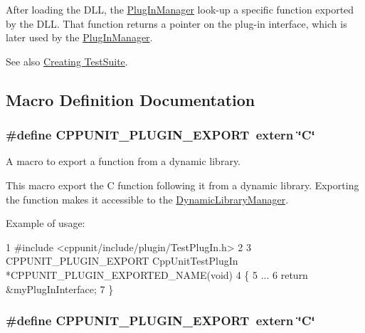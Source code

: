 After loading the D\+L\+L, the \hyperlink{class_plug_in_manager}{Plug\+In\+Manager} look-\/up a specific function exported by the D\+L\+L. That function returns a pointer on the plug-\/in interface, which is later used by the \hyperlink{class_plug_in_manager}{Plug\+In\+Manager}.

\begin{DoxySeeAlso}{See also}
\hyperlink{group___creating_test_suite}{Creating Test\+Suite}. 
\end{DoxySeeAlso}


\subsection{Macro Definition Documentation}
\hypertarget{group___writing_test_plug_in_ga477408f06c41af1d46b8f17f21b3b5d6}{
\subsubsection[{C\+P\+P\+U\+N\+I\+T\+\_\+\+P\+L\+U\+G\+I\+N\+\_\+\+E\+X\+P\+O\+R\+T}]{\setlength{\rightskip}{0pt plus 5cm}\#define C\+P\+P\+U\+N\+I\+T\+\_\+\+P\+L\+U\+G\+I\+N\+\_\+\+E\+X\+P\+O\+R\+T~extern \char`\"{}C\char`\"{}}}\label{group___writing_test_plug_in_ga477408f06c41af1d46b8f17f21b3b5d6}


A macro to export a function from a dynamic library. 

This macro export the C function following it from a dynamic library. Exporting the function makes it accessible to the \hyperlink{class_dynamic_library_manager}{Dynamic\+Library\+Manager}.

Example of usage\+: 
\begin{DoxyCode}
1 #include <cppunit/include/plugin/TestPlugIn.h>
2 
3 CPPUNIT\_PLUGIN\_EXPORT CppUnitTestPlugIn *CPPUNIT\_PLUGIN\_EXPORTED\_NAME(void)
4 \{
5   ...
6   return &myPlugInInterface;
7 \}
\end{DoxyCode}
 \hypertarget{group___writing_test_plug_in_ga477408f06c41af1d46b8f17f21b3b5d6}{
\subsubsection[{C\+P\+P\+U\+N\+I\+T\+\_\+\+P\+L\+U\+G\+I\+N\+\_\+\+E\+X\+P\+O\+R\+T}]{\setlength{\rightskip}{0pt plus 5cm}\#define C\+P\+P\+U\+N\+I\+T\+\_\+\+P\+L\+U\+G\+I\+N\+\_\+\+E\+X\+P\+O\+R\+T~extern \char`\"{}C\char`\"{}}}\label{group___writing_test_plug_in_ga477408f06c41af1d46b8f17f21b3b5d6}


